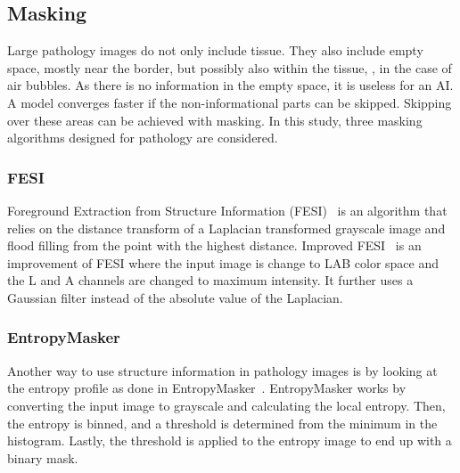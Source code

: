 \subsection{Masking}
Large pathology images do not only include tissue.
They also include empty space, mostly near the border, but possibly also within the tissue, \eg, in the case of air bubbles.
As there is no information in the empty space, it is useless for an AI.
A model converges faster if the non-informational parts can be skipped.
Skipping over these areas can be achieved with masking.
In this study, three masking algorithms designed for pathology are considered.

\subsubsection{FESI}
Foreground Extraction from Structure Information (FESI)~\cite{Bug2015} is an algorithm that relies on the distance transform of a Laplacian transformed grayscale image and flood filling from the point with the highest distance.
Improved FESI~\cite{Riasatian2020} is an improvement of FESI where the input image is change to LAB color space and the L and A channels are changed to maximum intensity.
It further uses a Gaussian filter instead of the absolute value of the Laplacian.

\subsubsection{EntropyMasker}
Another way to use structure information in pathology images is by looking at the entropy profile as done in EntropyMasker~\cite{Song2023}.
EntropyMasker works by converting the input image to grayscale and calculating the local entropy.
Then, the entropy is binned, and a threshold is determined from the minimum in the histogram.
Lastly, the threshold is applied to the entropy image to end up with a binary mask.
